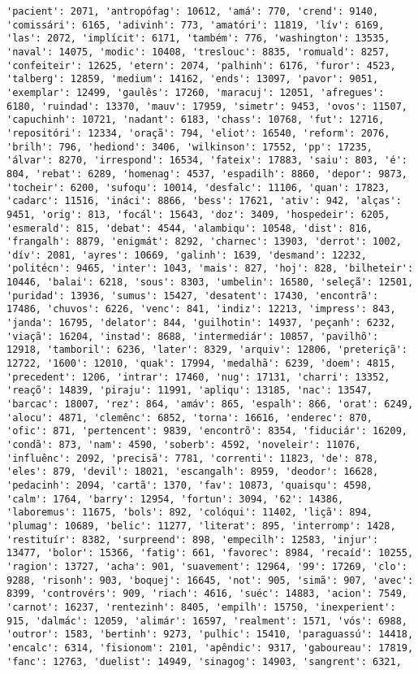 \documentclass[11pt]{article}
\begin{document}
\begin{Verbatim}[commandchars=\\\{\}]
'pacient': 2071, 'antropófag': 10612, 'amá': 770, 'crend': 9140, 'comissári': 6165, 'adivinh': 773, 'amatóri': 11819, 'lív': 6169, 'las': 2072, 'implícit': 6171, 'também': 776, 'washington': 13535, 'naval': 14075, 'modic': 10408, 'treslouc': 8835, 'romuald': 8257, 'confeiteir': 12625, 'etern': 2074, 'palhinh': 6176, 'furor': 4523, 'talberg': 12859, 'medium': 14162, 'ends': 13097, 'pavor': 9051, 'exemplar': 12499, 'gaulês': 17260, 'maracuj': 12051, 'afregues': 6180, 'ruindad': 13370, 'mauv': 17959, 'simetr': 9453, 'ovos': 11507, 'capuchinh': 10721, 'nadant': 6183, 'chass': 10768, 'fut': 12716, 'repositóri': 12334, 'oraçã': 794, 'eliot': 16540, 'reform': 2076, 'brilh': 796, 'hediond': 3406, 'wilkinson': 17552, 'pp': 17235, 'álvar': 8270, 'irrespond': 16534, 'fateix': 17883, 'saiu': 803, 'é': 804, 'rebat': 6289, 'homenag': 4537, 'espadilh': 8860, 'depor': 9873, 'tocheir': 6200, 'sufoqu': 10014, 'desfalc': 11106, 'quan': 17823, 'cadarc': 11516, 'ináci': 8866, 'bess': 17621, 'ativ': 942, 'alças': 9451, 'orig': 813, 'focál': 15643, 'doz': 3409, 'hospedeir': 6205, 'esmerald': 815, 'debat': 4544, 'alambiqu': 10548, 'dist': 816, 'frangalh': 8879, 'enigmát': 8292, 'charnec': 13903, 'derrot': 1002, 'dív': 2081, 'ayres': 10669, 'galinh': 1639, 'desmand': 12232, 'politécn': 9465, 'inter': 1043, 'mais': 827, 'hoj': 828, 'bilheteir': 10446, 'balai': 6218, 'sous': 8303, 'umbelin': 16580, 'seleçã': 12501, 'puridad': 13936, 'sumus': 15427, 'desatent': 17430, 'encontrã': 17486, 'chuvos': 6226, 'venc': 841, 'indiz': 12213, 'impress': 843, 'janda': 16795, 'delator': 844, 'guilhotin': 14937, 'peçanh': 6232, 'viaçã': 16204, 'instad': 8688, 'intermediár': 10857, 'pavilhõ': 12918, 'tamboril': 6236, 'later': 8329, 'arquiv': 12806, 'preteriçã': 12722, '1600': 12010, 'quak': 17994, 'medalhã': 6239, 'doem': 4815, 'precedent': 1206, 'intrar': 17460, 'nug': 17131, 'charri': 13352, 'reaçõ': 14839, 'piraju': 11991, 'apliqu': 13185, 'nac': 13547, 'barcac': 18007, 'rez': 864, 'amáv': 865, 'espalh': 866, 'orat': 6249, 'alocu': 4871, 'clemênc': 6852, 'torna': 16616, 'enderec': 870, 'ofic': 871, 'pertencent': 9839, 'encontrõ': 8354, 'fiduciár': 16209, 'condã': 873, 'nam': 4590, 'soberb': 4592, 'noveleir': 11076, 'influênc': 2092, 'precisã': 7781, 'correnti': 11823, 'de': 878, 'eles': 879, 'devil': 18021, 'escangalh': 8959, 'deodor': 16628, 'pedacinh': 2094, 'cartã': 1370, 'fav': 10873, 'quaisqu': 4598, 'calm': 1764, 'barry': 12954, 'fortun': 3094, '62': 14386, 'laboremus': 11675, 'bols': 892, 'colóqui': 11402, 'liçã': 894, 'plumag': 10689, 'belic': 11277, 'literat': 895, 'interromp': 1428, 'restituír': 8382, 'surpreend': 898, 'empecilh': 12583, 'injur': 13477, 'bolor': 15366, 'fatig': 661, 'favorec': 8984, 'recaíd': 10255, 'ragion': 13727, 'acha': 901, 'suavement': 12964, '99': 17269, 'clo': 9288, 'risonh': 903, 'boquej': 16645, 'not': 905, 'simã': 907, 'avec': 8399, 'controvérs': 909, 'riach': 4616, 'suéc': 14883, 'acion': 7549, 'carnot': 16237, 'rentezinh': 8405, 'empilh': 15750, 'inexperient': 915, 'dalmác': 12059, 'alimár': 16597, 'realment': 1571, 'vós': 6988, 'outror': 1583, 'bertinh': 9273, 'pulhic': 15410, 'paraguassú': 14418, 'encalc': 6314, 'fisionom': 2101, 'apêndic': 9317, 'gaboureau': 17819, 'fanc': 12763, 'duelist': 14949, 'sinagog': 14903, 'sangrent': 6321, 
\end{Verbatim}
\end{document}
